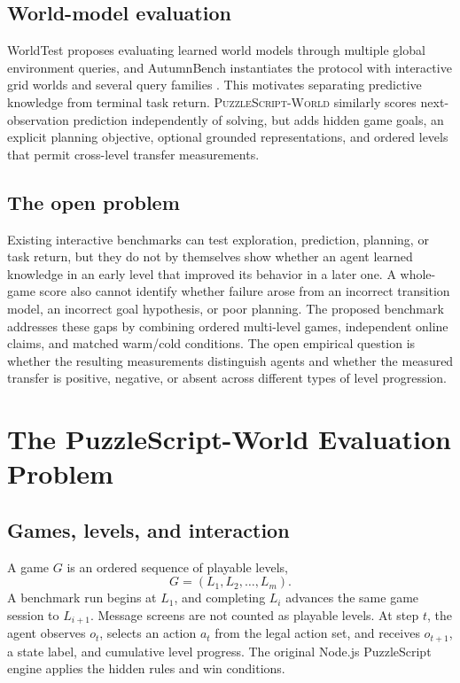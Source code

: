 \documentclass[a4paper,11pt]{article}
\newcommand{\benchmarkname}{\textsc{PuzzleScript-World}}
\begin{document}
\subsection{World-model evaluation}

WorldTest proposes evaluating learned world models through multiple global
environment queries, and AutumnBench instantiates the protocol with
interactive grid worlds and several query families
\cite{warrier2026worldtest}. This motivates separating predictive knowledge
from terminal task return. \benchmarkname{} similarly scores next-observation
prediction independently of solving, but adds hidden game goals, an explicit
planning objective, optional grounded representations, and ordered levels that
permit cross-level transfer measurements.

\subsection{The open problem}

Existing interactive benchmarks can test exploration, prediction, planning, or
task return, but they do not by themselves show whether an agent learned
knowledge in an early level that improved its behavior in a later one. A
whole-game score also cannot identify whether failure arose from an incorrect
transition model, an incorrect goal hypothesis, or poor planning. The proposed
benchmark addresses these gaps by combining ordered multi-level games,
independent online claims, and matched warm/cold conditions. The open empirical
question is whether the resulting measurements distinguish agents and whether
the measured transfer is positive, negative, or absent across different types
of level progression.

\section{The PuzzleScript-World Evaluation Problem}

\subsection{Games, levels, and interaction}

A game \(G\) is an ordered sequence of playable levels,
\[
  G = (L_1,L_2,\ldots,L_m).
\]
A benchmark run begins at \(L_1\), and completing \(L_i\) advances the same game
session to \(L_{i+1}\). Message screens are not counted as playable levels. At
step \(t\), the agent observes \(o_t\), selects an action \(a_t\) from the legal
action set, and receives \(o_{t+1}\), a state label, and cumulative level
progress. The original Node.js PuzzleScript engine applies the hidden rules and
win conditions.
\end{document}
